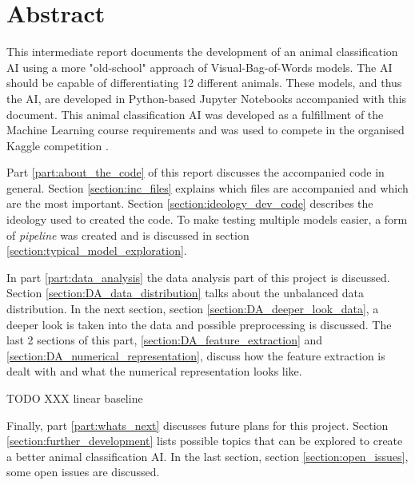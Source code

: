 \chapter*{Abstract}

This intermediate report documents the development of an animal classification AI using a more "old-school" approach of Visual-Bag-of-Words models.
The AI should be capable of differentiating 12 different animals.
These models, and thus the AI, are developed in Python-based Jupyter Notebooks accompanied with this document.
This animal classification AI was developed as a fulfillment of the Machine Learning course requirements and was used to compete in the organised Kaggle competition \citep{kaggle_competition}.

Part \ref{part:about_the_code} of this report discusses the accompanied code in general. Section \ref{section:inc_files} explains which files are accompanied and which are the most important. 
Section \ref{section:ideology_dev_code} describes the ideology used to created the code. 
To make testing multiple models easier, a form of \emph{pipeline} was created and is discussed in section \ref{section:typical_model_exploration}.

In part \ref{part:data_analysis} the data analysis part of this project is discussed.
Section \ref{section:DA_data_distribution} talks about the unbalanced data distribution.
In the next section, section \ref{section:DA_deeper_look_data}, a deeper look is taken into the data and possible preprocessing is discussed.
The last 2 sections of this part, \ref{section:DA_feature_extraction} and \ref{section:DA_numerical_representation}, discuss how the feature extraction is dealt with and what the numerical representation looks like.


TODO XXX linear baseline

Finally, part \ref{part:whats_next} discusses future plans for this project.
Section \ref{section:further_development} lists possible topics that can be explored to create a better animal classification AI.
In the last section, section \ref{section:open_issues}, some open issues are discussed.